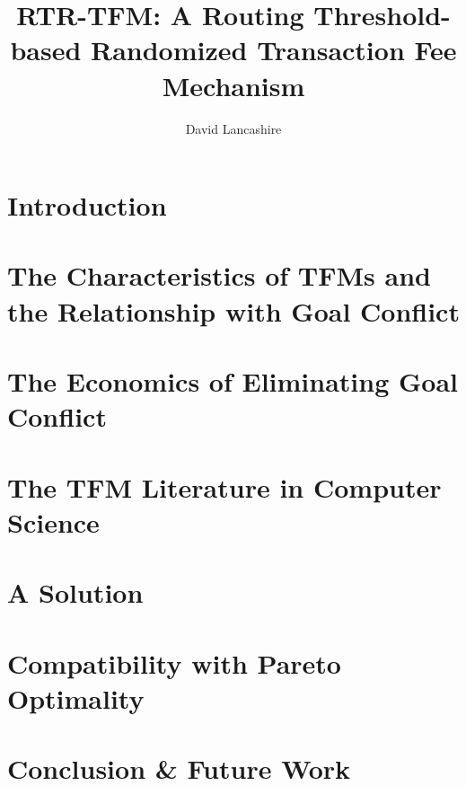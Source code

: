 \documentclass[sigconf,anonymous]{aamas}
\title[Routing Threshold-based Randomized Transaction Fee Mechanism]{RTR-TFM: A Routing Threshold-based Randomized Transaction Fee Mechanism}
\author{David Lancashire}
\affiliation{
  \institution{Proclus Technologies}
  \city{Bangkok}
  \country{Thailand}}
\begin{document}
\pagestyle{fancy}

\fancyhead{}
\maketitle 

\section{Introduction \label{sec::introduction}}


\section{The Characteristics of TFMs and the Relationship with Goal Conflict \label{sec::characteristics}}


\section{The Economics of Eliminating Goal Conflict \label{sec::economics}}


\section{The TFM Literature in Computer Science \label{sec::distsys}}


\section{A Solution \label{sec::solution}}


\section{Compatibility with Pareto Optimality \label{sec::compatibility}}


\section{Conclusion \& Future Work \label{sec::conclusion}}





\cleardoublepage
 


\end{document}

